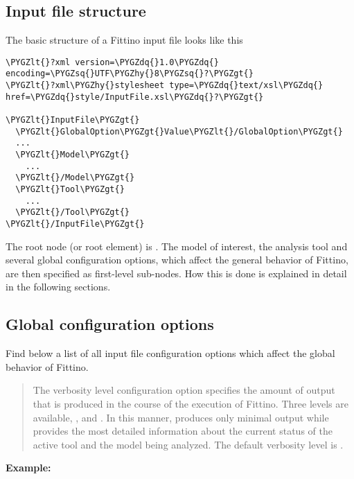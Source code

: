 \documentclass[letterpaper,10pt,english]{sphinxmanual}
\def\PYGZlt{\char`\<}
\def\PYGZgt{\char`\>}
\def\PYGZhy{\char`\-}
\def\PYGZsq{\char`\'}
\def\PYGZdq{\char`\"}
\renewcommand\PYGZsq{\textquotesingle}
\begin{document}
\subsection{Input file structure}
\label{input_file_structure:input-file-structure}\label{input_file_structure::doc}
The basic structure of a Fittino input file looks like this

\begin{Verbatim}[commandchars=\\\{\}]
\PYGZlt{}?xml version=\PYGZdq{}1.0\PYGZdq{} encoding=\PYGZsq{}UTF\PYGZhy{}8\PYGZsq{}?\PYGZgt{}
\PYGZlt{}?xml\PYGZhy{}stylesheet type=\PYGZdq{}text/xsl\PYGZdq{} href=\PYGZdq{}style/InputFile.xsl\PYGZdq{}?\PYGZgt{}

\PYGZlt{}InputFile\PYGZgt{}
  \PYGZlt{}GlobalOption\PYGZgt{}Value\PYGZlt{}/GlobalOption\PYGZgt{}
  ...
  \PYGZlt{}Model\PYGZgt{}
    ...
  \PYGZlt{}/Model\PYGZgt{}
  \PYGZlt{}Tool\PYGZgt{}
    ...
  \PYGZlt{}/Tool\PYGZgt{}
\PYGZlt{}/InputFile\PYGZgt{}
\end{Verbatim}

The root node (or root element) is . The model of interest, the analysis tool and
several global configuration options, which affect the general behavior of Fittino, are then
specified as first-level sub-nodes. How this is done is explained in detail in the following
sections.


\subsection{Global configuration options}
\label{global_configuration_options:global-configuration-options}\label{global_configuration_options::doc}
Find below a list of all input file configuration options which affect the global behavior of
Fittino.

\begin{quote}

The verbosity level configuration option specifies the amount of output that is produced in the
course of the execution of Fittino. Three levels are available, ,  and
. In this manner,  produces only minimal output while  provides the
most detailed information about the current status of the active tool and the model being
analyzed. The default verbosity level is .
\end{quote}

\textbf{Example:}
\end{document}
